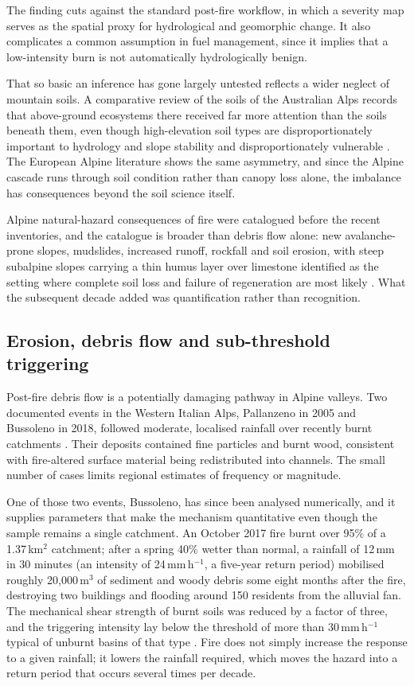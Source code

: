 \documentclass[11pt,a4paper]{article}
\begin{document}
The finding cuts against the standard post-fire workflow, in which a severity map serves as the spatial proxy for hydrological and geomorphic change. It also complicates a common assumption in fuel management, since it implies that a low-intensity burn is not automatically hydrologically benign.

That so basic an inference has gone largely untested reflects a wider neglect of mountain soils. A comparative review of the soils of the Australian Alps records that above-ground ecosystems there received far more attention than the soils beneath them, even though high-elevation soil types are disproportionately important to hydrology and slope stability and disproportionately vulnerable \citep{wilson_distribution_2022}. The European Alpine literature shows the same asymmetry, and since the Alpine cascade runs through soil condition rather than canopy loss alone, the imbalance has consequences beyond the soil science itself.

Alpine natural-hazard consequences of fire were catalogued before the recent inventories, and the catalogue is broader than debris flow alone: new avalanche-prone slopes, mudslides, increased runoff, rockfall and soil erosion, with steep subalpine slopes carrying a thin humus layer over limestone identified as the setting where complete soil loss and failure of regeneration are most likely \citep{muller_forest_2020}. What the subsequent decade added was quantification rather than recognition.

\subsection{Erosion, debris flow and sub-threshold triggering}

Post-fire debris flow is a potentially damaging pathway in Alpine valleys. Two documented events in the Western Italian Alps, Pallanzeno in 2005 and Bussoleno in 2018, followed moderate, localised rainfall over recently burnt catchments \citep{tiranti_wildfires_2021}. Their deposits contained fine particles and burnt wood, consistent with fire-altered surface material being redistributed into channels. The small number of cases limits regional estimates of frequency or magnitude.

One of those two events, Bussoleno, has since been analysed numerically, and it supplies parameters that make the mechanism quantitative even though the sample remains a single catchment. An October 2017 fire burnt over 95\% of a 1.37\,km$^2$ catchment; after a spring 40\% wetter than normal, a rainfall of 12\,mm in 30 minutes (an intensity of 24\,mm\,h$^{-1}$, a five-year return period) mobilised roughly 20{,}000\,m$^3$ of sediment and woody debris some eight months after the fire, destroying two buildings and flooding around 150 residents from the alluvial fan. The mechanical shear strength of burnt soils was reduced by a factor of three, and the triggering intensity lay below the threshold of more than 30\,mm\,h$^{-1}$ typical of unburnt basins of that type \citep{laporta_postwildfire_2025}. Fire does not simply increase the response to a given rainfall; it lowers the rainfall required, which moves the hazard into a return period that occurs several times per decade.
\end{document}
